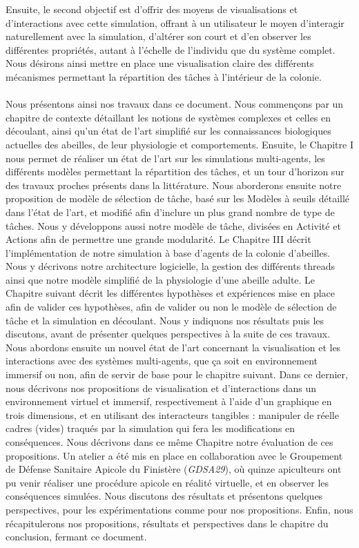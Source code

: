 	Ensuite, le second objectif est d'offrir des moyens de visualisations et d'interactions avec cette simulation, offrant à un utilisateur le moyen d'interagir naturellement avec la simulation, d'altérer son court et d'en observer les différentes propriétés, autant à l'échelle de l'individu que du système complet. Nous désirons ainsi mettre en place une visualisation claire des différents mécanismes permettant la répartition des tâches à l'intérieur de la colonie.
	
	\paragraph{}
	Nous présentons ainsi nos travaux dans ce document. Nous commençons par un chapitre de contexte détaillant les notions de systèmes complexes et celles en découlant, ainsi qu'un état de l'art simplifié sur les connaissances biologiques actuelles des abeilles, de leur physiologie et comportements.
	 Ensuite, le Chapitre I nous permet de réaliser un état de l'art sur les simulations multi-agents, les différents modèles permettant la répartition des tâches, et un tour d'horizon sur des travaux proches présents dans la littérature. 
	 Nous aborderons ensuite notre proposition de modèle de sélection de tâche, basé sur les Modèles à seuils détaillé dans l'état de l'art, et modifié afin d'inclure un plus grand nombre de type de tâches. Nous y développons aussi notre modèle de tâche, divisées en Activité et Actions afin de permettre une grande modularité. 
	 Le Chapitre III décrit l'implémentation de notre simulation à base d'agents de la colonie d'abeilles. Nous y décrivons notre architecture logicielle, la gestion des différents threads ainsi que notre modèle simplifié de la physiologie d'une abeille adulte. 
	 Le Chapitre suivant décrit les différentes hypothèses et expériences mise en place afin de valider ces hypothèses, afin de valider ou non le modèle de sélection de tâche et la simulation en découlant. Nous y indiquons nos résultats puis les discutons, avant de présenter quelques perspectives à la suite de ces travaux. 
	 Nous abordons ensuite un nouvel état de l'art concernant la visualisation et les interactions avec des systèmes multi-agents, que ça soit en environnement immersif ou non, afin de servir de base pour le chapitre suivant. 
	 Dans ce dernier, nous décrivons nos propositions de visualisation et d'interactions dans un environnement virtuel et immersif, respectivement à l'aide d'un graphique en trois dimensions, et en utilisant des interacteurs tangibles : manipuler de réelle cadres (vides) traqués par la simulation qui fera les modifications en conséquences. Nous décrivons dans ce même Chapitre notre évaluation de ces propositions. Un atelier a été mis en place en collaboration avec le Groupement de Défense Sanitaire Apicole du Finistère (\textit{GDSA29}), où quinze apiculteurs ont pu venir réaliser une procédure apicole en réalité virtuelle, et en observer les conséquences simulées. Nous discutons des résultats et présentons quelques perspectives, pour les expérimentations comme pour nos propositions. 
	 Enfin, nous récapitulerons nos propositions, résultats et perspectives dans le chapitre du conclusion, fermant ce document.